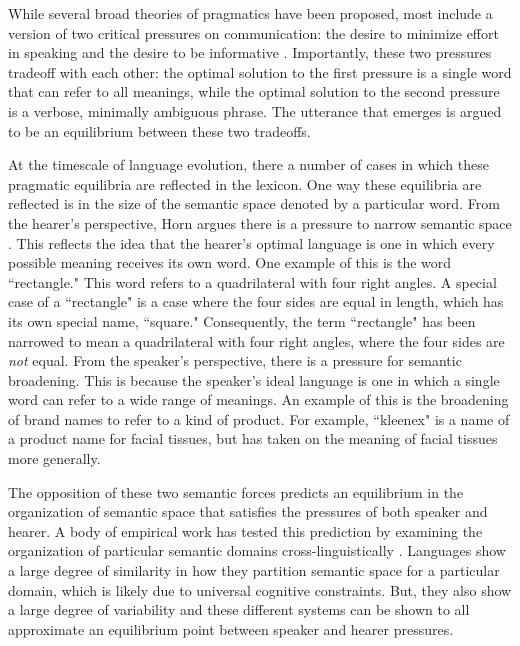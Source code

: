 \documentclass[man]{apa2}
\begin{document}
While several broad theories of pragmatics have been proposed, most include a version of  two critical pressures on communication: the desire to minimize effort in speaking and the desire to be informative \cite{zipf1936, horn1984}. Importantly, these two pressures tradeoff with each other: the optimal solution to the first pressure is a single word that can refer to all meanings, while the optimal solution to the second pressure is a verbose, minimally ambiguous  phrase. The utterance that emerges is argued to be an equilibrium between these two tradeoffs.

At the timescale of language evolution, there a number of cases in which these pragmatic equilibria  are reflected in the lexicon. One way these equilibria are reflected is in the size of the semantic space denoted by a particular word. From the hearer's perspective, Horn argues there is a pressure  to narrow semantic space \cite{horn1984}. This reflects the idea that the hearer's optimal language is one in which every possible meaning receives its own word. One example of this is the word ``rectangle." This word refers to a quadrilateral with four right angles. A special case of a ``rectangle"  is a case where the four sides are equal in length, which has its own special name, ``square." Consequently, the term ``rectangle" has been narrowed to mean a quadrilateral with four right angles, where the four sides are {\it not} equal. From the speaker's perspective, there is a pressure for semantic broadening. This is because the speaker's ideal language is one in which a single word can refer to a wide range of meanings. An example of this is the broadening of brand names to refer to a kind of product. For example, ``kleenex" is a name of a product name for facial tissues, but has taken on the meaning of facial tissues more generally.

The opposition of these two semantic forces predicts an equilibrium in the organization of semantic space that satisfies the pressures of both speaker and hearer. A body of empirical work has tested this prediction by examining the organization of particular semantic domains cross-linguistically \cite{regierword}. Languages show a large degree of similarity in how they partition semantic space for a particular domain, which is likely due to universal cognitive constraints. But, they also show a large degree of variability and these different systems can be shown to all approximate an equilibrium point between speaker and hearer pressures. 
\end{document}
